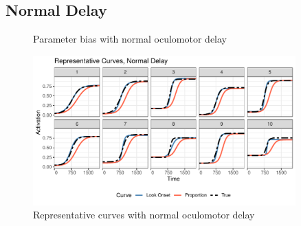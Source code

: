 \documentclass{article}
\begin{document}
\subsection{Normal Delay}

\begin{figure}[H]
\centering
\caption{Parameter bias with normal oculomotor delay}
\label{fig:par_bias_normal_delay}
\end{figure}

\begin{figure}[H]
\centering
\includegraphics[width=0.9\textwidth]{rep_curves_normal_delay.pdf}
\caption{Representative curves with normal oculomotor delay}
\label{fig:rep_curves_normal_delay}
\end{figure}
\end{document}

